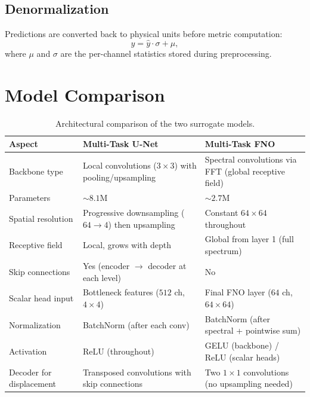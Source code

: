 \documentclass[11pt,a4paper]{article}
\begin{document}
\subsection{Denormalization}

Predictions are converted back to physical units before metric computation:
\[
    y = \hat{y} \cdot \sigma + \mu,
\]
where $\mu$ and $\sigma$ are the per-channel statistics stored during
preprocessing.


\section{Model Comparison}
\label{sec:comparison}

\begin{table}[H]
\centering
\caption{Architectural comparison of the two surrogate models.}
\label{tab:comparison}
\begin{tabularx}{\textwidth}{@{}lXX@{}}
\toprule
\textbf{Aspect} & \textbf{Multi-Task U-Net} & \textbf{Multi-Task FNO} \\
\midrule
Backbone type &
    Local convolutions ($3 \times 3$) with pooling/upsampling &
    Spectral convolutions via FFT (global receptive field) \\[4pt]

Parameters &
    ${\sim}8.1$M &
    ${\sim}2.7$M \\[4pt]

Spatial resolution &
    Progressive downsampling ($64 \to 4$) then upsampling &
    Constant $64 \times 64$ throughout \\[4pt]

Receptive field &
    Local, grows with depth &
    Global from layer 1 (full spectrum) \\[4pt]

Skip connections &
    Yes (encoder $\to$ decoder at each level) &
    No \\[4pt]

Scalar head input &
    Bottleneck features ($512$ ch, $4 \times 4$) &
    Final FNO layer ($64$ ch, $64 \times 64$) \\[4pt]

Normalization &
    BatchNorm (after each conv) &
    BatchNorm (after spectral + pointwise sum) \\[4pt]

Activation &
    ReLU (throughout) &
    GELU (backbone) / ReLU (scalar heads) \\[4pt]

Decoder for displacement &
    Transposed convolutions with skip connections &
    Two $1 \times 1$ convolutions (no upsampling needed) \\
\bottomrule
\end{tabularx}
\end{table}
\end{document}
